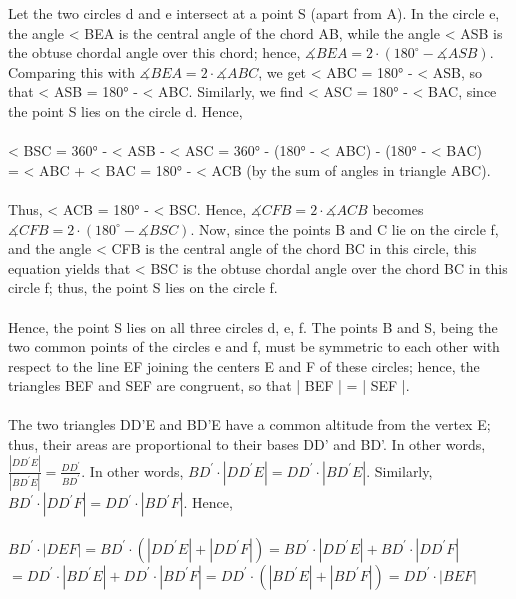 Let the two circles d and e intersect at a point S (apart from A). In the circle e, the angle < BEA is the central angle of the chord AB, while the angle < ASB is the obtuse chordal angle over this chord; hence, $\measuredangle BEA=2\cdot\left(180^{\circ}-\measuredangle ASB\right)$. Comparing this with $\measuredangle BEA=2\cdot\measuredangle ABC$, we get < ABC = 180° - < ASB, so that < ASB = 180° - < ABC. Similarly, we find < ASC = 180° - < BAC, since the point S lies on the circle d. Hence, \\\\
< BSC = 360° - < ASB - < ASC = 360° - (180° - < ABC) - (180° - < BAC) \\
= < ABC + < BAC = 180° - < ACB          (by the sum of angles in triangle ABC). \\\\
Thus, < ACB = 180° - < BSC. Hence, $\measuredangle CFB=2\cdot\measuredangle ACB$ becomes $\measuredangle CFB=2\cdot\left(180^{\circ}-\measuredangle BSC\right)$. Now, since the points B and C lie on the circle f, and the angle < CFB is the central angle of the chord BC in this circle, this equation yields that < BSC is the obtuse chordal angle over the chord BC in this circle f; thus, the point S lies on the circle f. \\\\
Hence, the point S lies on all three circles d, e, f. The points B and S, being the two common points of the circles e and f, must be symmetric to each other with respect to the line EF joining the centers E and F of these circles; hence, the triangles BEF and SEF are congruent, so that | BEF | = | SEF |. \\\\
The two triangles DD'E and BD'E have a common altitude from the vertex E; thus, their areas are proportional to their bases DD' and BD'. In other words, $\frac{\left|DD^{\prime}E\right|}{\left|BD^{\prime}E\right|}=\frac{DD^{\prime}}{BD^{\prime}}$. In other words, $BD^{\prime}\cdot\left|DD^{\prime}E\right|=DD^{\prime}\cdot\left|BD^{\prime}E\right|$. Similarly, $BD^{\prime}\cdot\left|DD^{\prime}F\right|=DD^{\prime}\cdot\left|BD^{\prime}F\right|$. Hence, \\\\
$BD^{\prime}\cdot\left|DEF\right|=BD^{\prime}\cdot\left(\left|DD^{\prime}E\right|+\left|DD^{\prime}F\right|\right)=BD^{\prime}\cdot\left|DD^{\prime}E\right|+BD^{\prime}\cdot\left|DD^{\prime}F\right|$ \\
$=DD^{\prime}\cdot\left|BD^{\prime}E\right|+DD^{\prime}\cdot\left|BD^{\prime}F\right|=DD^{\prime}\cdot\left(\left|BD^{\prime}E\right|+\left|BD^{\prime}F\right|\right)=DD^{\prime}\cdot\left|BEF\right|$ \\
